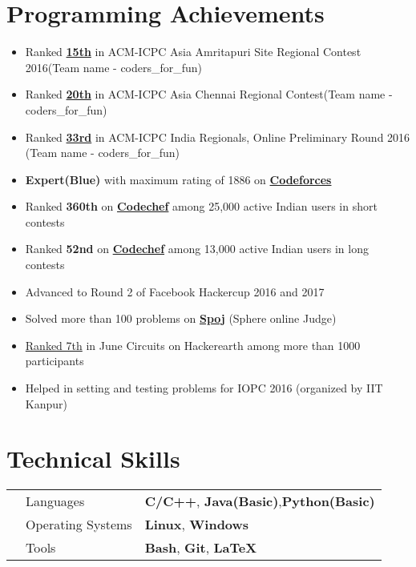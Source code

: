 \documentclass[11pt,a4paper]{article}
\begin{document}
\section*{Programming Achievements}
\begin{itemize}
\item Ranked \href{http://amrita2016.cloudcontest.org/public/}{\textbf{15th}} in ACM-ICPC Asia Amritapuri Site Regional Contest 2016(Team name - coders\_for\_fun)
\item Ranked \href{https://icpc.baylor.edu/regionals/finder/ar-chennai-2016/standings} {\textbf{20th}} in ACM-ICPC Asia Chennai Regional Contest(Team name - coders\_for\_fun) 
\item Ranked \href{https://www.codechef.com/rankings/ACMIND16?order=asc&page=2&sortBy=rank} {\textbf{33rd}} in ACM-ICPC India Regionals, Online Preliminary Round 2016 (Team name - coders\_for\_fun)
\item \textbf{Expert(Blue)} with maximum rating of 1886 on  \href{http://codeforces.com/profile/Swastik1996} {\textbf{Codeforces}}
\item Ranked \textbf{360th} on \href{http://codechef.com/users/Swastik1996} {\textbf{Codechef}} among 25,000 active Indian users in short contests
\item Ranked \textbf{52nd} on \href{http://codechef.com/users/Swastik1996} {\textbf{Codechef}} among 13,000 active Indian users in long contests
\item Advanced to Round 2 of Facebook Hackercup 2016 and 2017
\item Solved more than 100 problems on \href{http://www.spoj.com/users/swastik1996/} {\textbf{Spoj}} (Sphere online Judge)
\item \href{https://www.hackerearth.com/june-circuits/leaderboard/} {Ranked 7th} in June Circuits on Hackerearth among more than 1000 participants 
\item Helped in setting and testing problems for IOPC 2016 (organized by IIT Kanpur)
\end{itemize}

\section*{Technical Skills}
\vspace{-0.2cm}
\begin{tabular}{L{0.05cm} L{5cm} l}
&Languages     &\textbf{C/C++}, \textbf{Java(Basic)},\textbf{Python(Basic)}\\
&Operating Systems     &\textbf{Linux}, \textbf{Windows}\\
&Tools &\textbf{Bash}, \textbf{Git}, \textbf{\LaTeX}\\
\end{tabular}
\vspace{-0.4cm}
\end{document}
